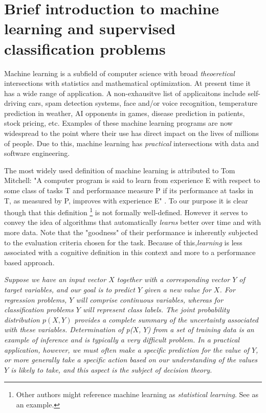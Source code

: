 
\section{ Brief introduction to machine learning and supervised classification problems}

Machine learning is a subfield of computer science with broad \textit{theoeretical} intersections with statistics and mathematical optimization. At present time it has a wide range of application. A non-exhausitve list of applicaitons include self-driving cars, spam detection systems, face and/or voice recognition, temperature prediction in weather, AI opponents in games, disease prediction in patients, stock pricing, etc. Examples of these machine learning programs are now widespread to the point where their use has direct impact on the lives of millions of people. Due to this, machine learning has \textit{practical} intersections with data and software engineering.

The most widely used definition of machine learning is attributed to Tom Mitchell: 	 
"A computer program is said to learn from experience E with respect to some class of tasks T and performance measure P if its performance at tasks in T, as measured by P, improves with experience E" \cite{Mitchell-MLearning}. To our purpose it is clear though that this definition \footnote{Other authors might reference machine learning as \textit{statistical learning}. See \cite{hastie-elemstatslearn} as an example.} is not formally well-defined. However it serves to convey the idea of algorithms that automatically \textit{learns} better over time and with more data. Note that the "goodness" of their performance is inherently subjected to the evaluation criteria chosen for the task. Because of this,\textit{learning} is less associated with a cognitive definition in this context and more to a performance based approach.

\textit{Suppose we have an input vector $X$ together with a corresponding vector $Y$ of target variables, and our goal is to predict $Y$ given a new value for $X$. For regression problems, $Y$ will comprise continuous variables, whereas for classification problems $Y$ will represent class labels. The joint probability distribution $p(X, Y)$ provides a complete summary of the uncertainty associated with these variables. Determination of p($X$, $Y$) from a set of training data is an example of inference and is typically a very difficult problem. In a practical application, however, we must often make a specific prediction for the value of $Y$, or more generally take a specific action based on our understanding of the values $Y$ is likely to take, and this aspect is the subject of decision theory.}




